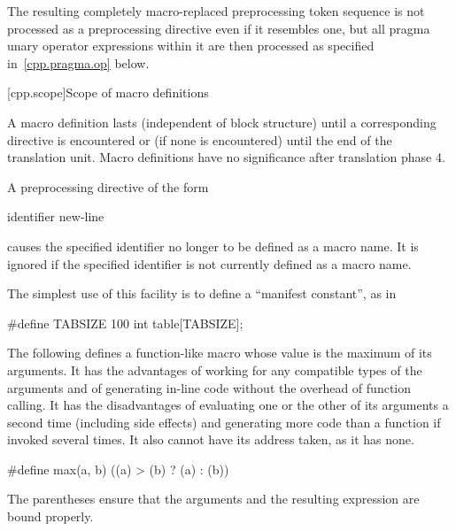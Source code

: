 \pnum
The resulting completely macro-replaced preprocessing token sequence
is not processed as a preprocessing directive even if it resembles one,
but all pragma unary operator expressions within it are then processed as
specified in~\ref{cpp.pragma.op} below.

[cpp.scope]{Scope of macro definitions}%
%

\pnum
A macro definition lasts
(independent of block structure)
until a corresponding
directive is encountered or
(if none is encountered)
until the end of the translation unit.
Macro definitions have no significance after translation phase 4.

\pnum
A preprocessing directive of the form

\begin{ncsimplebnf}
 identifier new-line
%
\end{ncsimplebnf}

causes the specified identifier no longer to be defined as a macro name.
It is ignored if the specified identifier is not currently defined as
a macro name.

\pnum
\begin{example}
The simplest use of this facility is to define a ``manifest constant'',
as in
\begin{codeblock}
#define TABSIZE 100
int table[TABSIZE];
\end{codeblock}
\end{example}

\pnum
\begin{example}
The following defines a function-like
macro whose value is the maximum of its arguments.
It has the advantages of working for any compatible types of the arguments
and of generating in-line code without the overhead of function calling.
It has the disadvantages of evaluating one or the other of its arguments
a second time
(including
%
side effects)
and generating more code than a function if invoked several times.
It also cannot have its address taken,
as it has none.

\begin{codeblock}
#define max(a, b) ((a) > (b) ? (a) : (b))
\end{codeblock}

The parentheses ensure that the arguments and
the resulting expression are bound properly.
\end{example}

